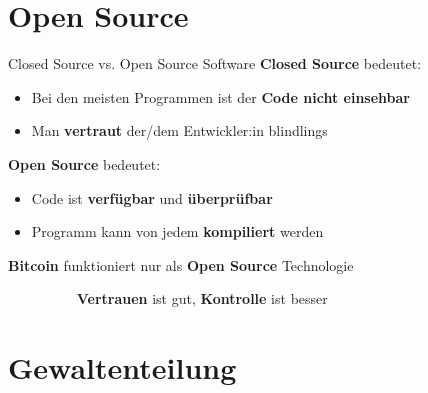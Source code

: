\documentclass[aspectratio=169,t,11pt]{beamer}
\begin{document}
\section{Open Source}

\begin{frame}{Closed Source vs. Open Source Software}
	\textbf{Closed Source} bedeutet:
	\begin{itemize}
		\item Bei den meisten Programmen ist der \textbf{Code nicht einsehbar}
		\item Man \textbf{vertraut} der/dem Entwickler:in blindlings
	\end{itemize}

	\vspace{0.5em}
	\textbf{Open Source} bedeutet:
	\begin{itemize}
		\item Code ist \textbf{verfügbar} und \textbf{überprüfbar}
		\item Programm kann von jedem \textbf{kompiliert} werden
	\end{itemize}

	\vspace{0.5em}
	\textbf{Bitcoin} funktioniert nur als \textbf{Open Source} Technologie

	\vspace{1em}
	\begin{alertblock}{\textcolor{white}{Grundsatz}}
		\vspace{3pt}
		\textbf{Vertrauen} ist gut, \textbf{Kontrolle} ist besser
		\vspace{3pt}
	\end{alertblock}
\end{frame}

\section{Gewaltenteilung}
\end{document}
